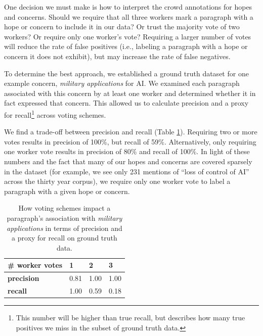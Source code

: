 \documentclass[letterpaper]{article}
\begin{document}
One decision we must make is how to interpret the crowd annotations for  hopes and concerns. Should we require that all three workers mark a paragraph with a hope or concern to include it in our data? Or trust the majority vote of two workers? Or require only one worker's vote? Requiring a larger number of votes will reduce the rate of false positives (i.e., labeling a paragraph with a hope or concern it does not exhibit), but may increase the rate of false negatives. 

To determine the best approach, we established a ground truth dataset for one example concern, \textit{military applications} for  AI. We examined each paragraph associated with this concern by at least one worker and determined whether it in fact expressed that concern. This allowed us to calculate precision and
a proxy for recall\footnote{This number will be higher than true recall, but describes how many true positives we miss in the subset of ground truth data.} across voting schemes.

We find a trade-off between precision and recall (Table \ref{tbl:rates}). Requiring two or more votes results in precision of 100\%, but recall of 59\%. Alternatively, only requiring one worker vote results in precision of 80\% and recall of 100\%. In light of these numbers and the fact that many of our hopes and concerns are covered sparsely in the dataset (for example, we see only 231 mentions of ``loss of control of AI'' across the thirty year corpus), we require only one worker vote to label a paragraph with a given hope or concern.

\begin{table}[!ht]
  \renewcommand{\arraystretch}{1.3}
  \begin{tabular}{p{8.5em}p{3em}p{3em}p{3em}}
   \textbf{\# worker votes} & 1 & 2 & 3\\
   \hline
   \textbf{precision} & 0.81 & 1.00 & 1.00 \\
   \textbf{recall} & 1.00 & 0.59 & 0.18 \\

  \end{tabular}
  \caption{How voting schemes impact a paragraph's association with \textit{military applications} in terms of precision and a proxy for recall on ground truth data. %
  }
  \label{tbl:rates}
\end{table}
\end{document}
